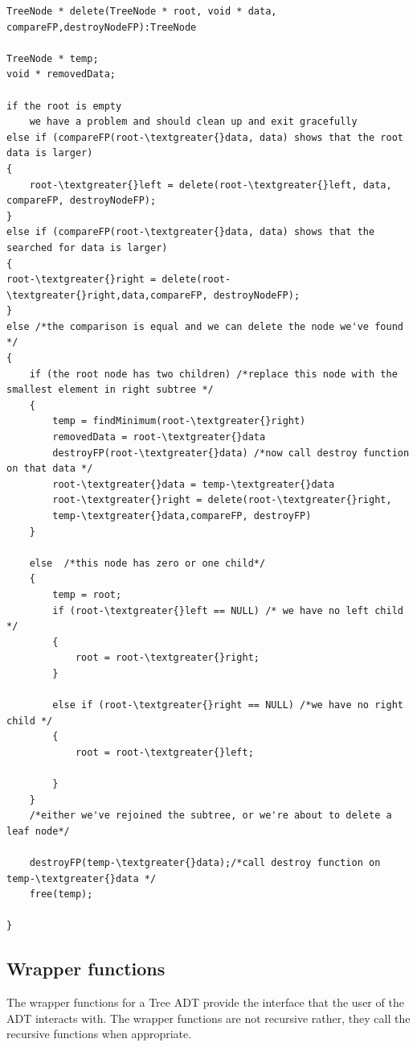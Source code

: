 \begin{lstlisting}
TreeNode * delete(TreeNode * root, void * data, compareFP,destroyNodeFP):TreeNode

TreeNode * temp;
void * removedData;

if the root is empty
	we have a problem and should clean up and exit gracefully
else if (compareFP(root-\textgreater{}data, data) shows that the root data is larger)
{
	root-\textgreater{}left = delete(root-\textgreater{}left, data, compareFP, destroyNodeFP);
}
else if (compareFP(root-\textgreater{}data, data) shows that the searched for data is larger)
{
root-\textgreater{}right = delete(root-\textgreater{}right,data,compareFP, destroyNodeFP);
}
else /*the comparison is equal and we can delete the node we've found */
{
	if (the root node has two children) /*replace this node with the smallest element in right subtree */
	{
		temp = findMinimum(root-\textgreater{}right)
		removedData = root-\textgreater{}data
		destroyFP(root-\textgreater{}data) /*now call destroy function on that data */
		root-\textgreater{}data = temp-\textgreater{}data
		root-\textgreater{}right = delete(root-\textgreater{}right,
		temp-\textgreater{}data,compareFP, destroyFP)
	}

	else  /*this node has zero or one child*/
	{
		temp = root;
		if (root-\textgreater{}left == NULL) /* we have no left child */
		{
			root = root-\textgreater{}right;
		}

		else if (root-\textgreater{}right == NULL) /*we have no right child */
		{
			root = root-\textgreater{}left;

		}
	}
	/*either we've rejoined the subtree, or we're about to delete a leaf node*/

	destroyFP(temp-\textgreater{}data);/*call destroy function on temp-\textgreater{}data */
	free(temp);

}
\end{lstlisting}
\subsection{Wrapper functions}

The wrapper functions for a Tree ADT provide the interface that the user
of the ADT interacts with.
The wrapper functions are not recursive rather, they call the recursive
functions when appropriate.

